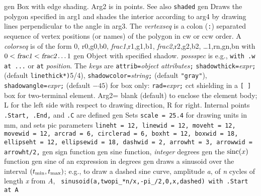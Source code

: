   {gen}
  {Box with edge shading.  Arg2 is in points. See also {\tt shaded} }
 {gen}
  {Draws the polygon specified in arg1 and
  shades the interior according
   to arg4 by drawing lines perpendicular to the angle in arg3.  The {\sl
   vertexseq} is a colon ({\tt:}) separated sequence of vertex positions
   (or names) of the polygon in cw or ccw order. A {\sl colorseq} is of
   the form 0, r0,g0,b0, {\sl frac1},r1,g1,b1, {\sl frac2},r2,g2,b2,
   \ldots 1,rn,gn,bn with $0 < \hbox{\sl frac1} < \hbox{\sl frac2}
   \ldots 1$ }
  {gen}
  { Object with specified shadow.  {\sl possspec} is e.g.,
    {\tt with .w at ...} or {\tt at} {\sl position}.
    The {\sl keys} are
       {\tt attrib=}{\sl object attributes}{\tt ;}
       {\tt shadowthick=}{\sl expr}{\tt ;} (default {\tt linethick*)}5/4),
       {\tt shadowcolor=}{\sl string}{\tt ;} (default {\tt "gray"}),
       {\tt shadowangle=}{\sl expr}{\tt ;} (default $-45$)
       for box only: {\tt rad=}{\sl expr}{\tt ;}
 }
 {cct}
  {shielding in a {\tt [ ]} box for
  two-terminal element. Arg2= blank
    (default) to enclose the element body; L for the left side with
    respect to drawing direction, R for right. Internal points {\tt
    .Start, .End,} and {\tt .C} are defined}
  {gen}
  {Sets {\tt scale = 25.4} for drawing units in mm, and sets
   pic parameters {\tt lineht = 12, linewid = 12, moveht = 12,
    movewid = 12,
    arcrad = 6, circlerad = 6, boxht = 12, boxwid = 18, ellipseht = 12,
    ellipsewid = 18, dashwid = 2, arrowht = 3, arrowwid = arrowht/2,}}
  {gen}
  {sign function}
  {gen}
  {sine function, {\sl integer\/} degrees}
  {gen}
  {the $\hbox{sinc}(x)$ function}
  {gen}
  {sine of an expression in degrees}
  {gen}
  {draws a sinusoid over the interval $(t_{\hbox{\scriptsize min}},
  t_{\hbox{\scriptsize max}})$;
   e.g., to draw a dashed sine curve, amplitude {\sl a},
   of {\sl n} cycles of length {\sl x} from {\sl A}, {\tt
   sinusoid(a,twopi\_*n/x,-pi\_/2,0,x,dashed) with .Start at A}}
